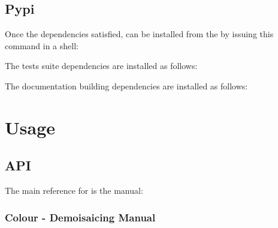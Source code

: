 \documentclass[letterpaper,10pt,english]{sphinxmanual}
\begin{document}
\section{Pypi}
\label{\detokenize{index:pypi}}
Once the dependencies satisfied,  can be installed from
the  by
issuing this command in a shell:

%
\begin{sphinxVerbatim}[commandchars=\\\{\}]
  
\end{sphinxVerbatim}

The tests suite dependencies are installed as follows:

%
\begin{sphinxVerbatim}[commandchars=\\\{\}]
  
\end{sphinxVerbatim}

The documentation building dependencies are installed as follows:

%
\begin{sphinxVerbatim}[commandchars=\\\{\}]
  
\end{sphinxVerbatim}


\chapter{Usage}
\label{\detokenize{index:usage}}

\section{API}
\label{\detokenize{index:api}}
The main reference for
is the manual:


\subsection{Colour - Demoisaicing Manual}
\label{\detokenize{manual:colour-demoisaicing-manual}}\label{\detokenize{manual::doc}}
\end{document}
